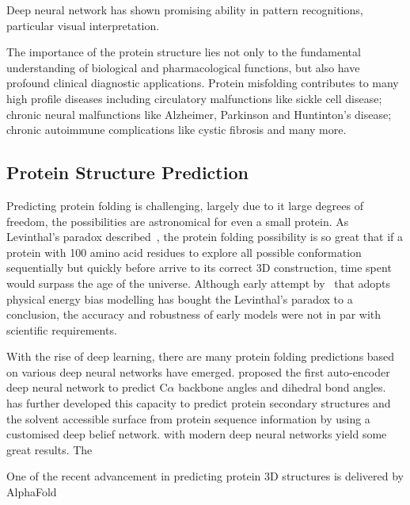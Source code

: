 Deep neural network has shown promising ability in pattern recognitions, particular visual interpretation.
\par 
The importance of the protein structure lies not only to the fundamental understanding of biological and pharmacological functions, but also have profound clinical diagnostic applications. Protein misfolding contributes to many high profile diseases including circulatory malfunctions like sickle cell disease; chronic neural malfunctions like Alzheimer, Parkinson and Huntinton's disease; chronic autoimmune complications like cystic fibrosis and many more.~\cite{Hammarstrom_2003,Chiti_2006,Selkoe_2003}  
\par 

\subsection{Protein Structure Prediction}
Predicting protein folding is challenging, largely due to it large degrees of freedom, the possibilities are astronomical for even a small protein. As Levinthal's paradox described~\cite{LEV69}, the protein folding possibility is so great that if a protein with 100 amino acid residues to explore all possible conformation sequentially but quickly before arrive to its correct 3D construction, time spent would surpass the age of the universe. Although early attempt by~\citet{Zwanzig_1992} that adopts physical energy bias modelling has bought the Levinthal's paradox to a conclusion, the accuracy and robustness of early models were not in par with scientific requirements.  
\par 
With the rise of deep learning, there are many protein folding predictions based on various deep neural networks have emerged. \citet{Lyons_2014} proposed the first auto-encoder deep neural network to predict C$\alpha$ backbone angles and dihedral bond angles.~\citet{Heffernan_2015} has further developed this capacity to predict protein secondary structures and the solvent accessible surface from protein sequence information by using a customised deep belief network.  with modern deep neural networks yield some great results. The 

One of the recent advancement in predicting protein 3D structures is delivered by AlphaFold